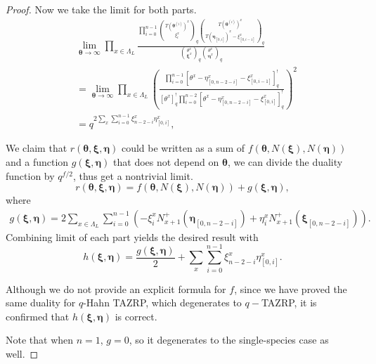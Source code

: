 \documentclass{ximera}
\begin{document}
\begin{proof}
Now we take the limit for both parts.
\begin{align*}
   &\lim_{\boldsymbol\theta\xrightarrow{}\infty}    \prod_{x \in \Lambda_L }\frac{\prod_{i=0}^{n-1}\binom{T(\boldsymbol\theta^{(i)})^x}{\xi_i^x}_q \binom{T(\boldsymbol\theta^{(i)})^x}{T(\boldsymbol\eta_{[0,i]})^x-\xi^x_{[0,i-1]}}_q}{\binom{\theta^x}{\boldsymbol\xi^x}_q\binom{\theta^x}{\boldsymbol\eta^x}_q}\\
  &=\lim_{\boldsymbol\theta\xrightarrow{}\infty}  \prod_{x \in \Lambda_L }\left(\frac{\prod_{i=0}^{n-1}[\theta^x-\eta^x_{[0,n-2-i]}-\xi^x_{[0,i-1]}]^!_q}{[\theta^x]_q^!\prod_{i=0}^{n-2}[\theta^x-\eta^x_{[0,n-2-i]}-\xi^x_{[0,i]}]^!_q}\right)^2\\
 & =q^{2\sum_x\sum_{i=0}^{n-1}\xi^x_{n-2-i}\eta^x_{[0,i]}}, 
\end{align*}
 



We claim that $ r(\boldsymbol\theta,\boldsymbol\xi,\boldsymbol\eta)$ could be written as a sum of $f(\boldsymbol\theta,N(\boldsymbol\xi),N(\boldsymbol\eta))$ and a function $g(\boldsymbol\xi,\boldsymbol\eta)$ that does not depend on $\boldsymbol\theta$, we can divide the duality function by $q^{f/2}$, thus get a nontrivial limit.
\begin{equation*}
     r(\boldsymbol\theta,\boldsymbol\xi,\boldsymbol\eta)=f(\boldsymbol\theta,N(\boldsymbol\xi),N(\boldsymbol\eta))+g(\boldsymbol\xi,\boldsymbol\eta),
\end{equation*}
where
\begin{equation*}
\begin{split}
    g(\boldsymbol\xi,\boldsymbol\eta)
    =2\sum_{x \in \Lambda_L }\sum_{i=0}^{n-1}\left(-\xi_i^xN_{x+1}^+(\boldsymbol\eta_{[0,n-2-i]})+\eta_i^xN_{x+1}^+(\boldsymbol\xi_{[0,n-2-i]})\right).
\end{split}    
\end{equation*}
Combining limit of each part yields the desired result with
$$h(\boldsymbol\xi,\boldsymbol\eta)= \frac{g(\boldsymbol\xi,\boldsymbol\eta)}{2}+\sum_x\sum_{i=0}^{n-1}\xi^x_{n-2-i}\eta^x_{[0,i]}.$$

Although we do not provide an explicit formula for $f$, since we have proved the same duality for $q$-Hahn TAZRP, which degenerates to $q-$TAZRP, it is confirmed that $h(\boldsymbol\xi,\boldsymbol\eta)$ is correct.

Note that when $n=1$, $g=0$, so it degenerates to the single-species case as well.

\end{proof}
\end{document}
